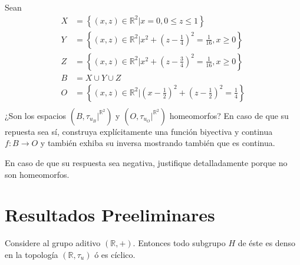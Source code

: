 \documentclass[12pt]{report}
\theoremstyle{largebreak}
\newcommand\cf[3]{\ensuremath{#1:#2\rightarrow#3}}
\begin{document}
    \begin{excer}
        Sean
        \begin{equation*}
            \begin{split}
                X&=\left\{(x,z)\in\mathbb{R}^2\Big|x=0,0\leq z\leq 1 \right\}\\
                Y&=\left\{(x,z)\in\mathbb{R}^2\Big|x^2+\left(z-\frac{1}{4} \right)^2=\frac{1}{16},x\geq 0 \right\}\\
                Z&=\left\{(x,z)\in\mathbb{R}^2\Big| x^2+\left(z-\frac{3}{4} \right)^2=\frac{1}{16},x\geq0 \right\}\\
                B&=X\cup Y\cup Z\\
                O&=\left\{(x,z)\in\mathbb{R}^2\Big|\left(x-\frac{1}{2} \right)^2+\left(z-\frac{1}{2} \right)^2=\frac{1}{4} \right\}\\
            \end{split}
        \end{equation*}
        ¿Son los espacios $(B,\tau_{ u_{B}}|^{\mathbb{R}^2})$ y $(O,\tau_{ u_{O}}|^{\mathbb{R}^2})$ homeomorfos? En caso de que su repuesta sea sí, construya explícitamente una función biyectiva y continua $\cf{f}{B}{O}$ y también exhiba su inversa mostrando también que es continua.

        En caso de que su respuesta sea negativa, justifique detalladamente porque no son homeomorfos.
    \end{excer}
    
    \section{Resultados Preeliminares}
    
    \begin{propo}
        Considere al grupo aditivo $(\mathbb{R},+)$. Entonces todo subgrupo $H$ de éste es denso en la topología $(\mathbb{R},\tau_u)$ ó es cíclico.
    \end{propo}
\end{document}
